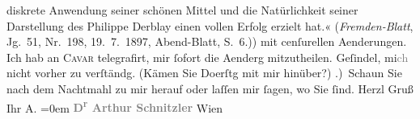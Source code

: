 \begin{ledgroupsized}[t]{13cm}
{{{                     diskrete Anwendung seiner schönen Mittel und die Natürlichkeit seiner
                     Darstellung des Philippe Derblay einen vollen Erfolg erzielt hat.« (\emph{Fremden-Blatt}, Jg. 51, Nr. 198,
                        19. 7. 1897, Abend-Blatt, S. 6.)}}}\label{K_L00707-1h}) mit cenſurellen
               Aenderungen. Ich hab an \textsc{Cavar} telegrafirt, mir {\pb}ſofort die Aenderg
               mitzutheilen. Geſindel, mi\textcolor{gray}{ch} nicht vorher zu verſtändg. (Kämen Sie
                     Do{\geminationn}erſtg mit mir hinüber?)\pend
           .) Schaun Sie nach dem Nachtmahl zu mir herauf oder laſſen mir ſagen, wo Sie
               ſind.\pend
           \pstart
           Herzl Gruß{\\[\baselineskip]}Ihr \spacefill\mbox{A.}\pend
           \leftskip=0em{}\pstart
           \noindent{}\centering{}\textcolor{gray}{\textbf{D\textsuperscript{r} Arthur Schnitzler}}\pend
           \pstart
           \noindent{}\raggedleft{}Wien\pend
           
         
         \endnumbering{}\end{ledgroupsized}  \newcommand{\dateiname}{L00707}\newcommand{\titel}{Arthur Schnitzler an Richard Beer-Hofmann, 20. 7. 1897}\newcommand{\editorInnen}{Martin Anton Müller und Gerd-Hermann Susen}
      